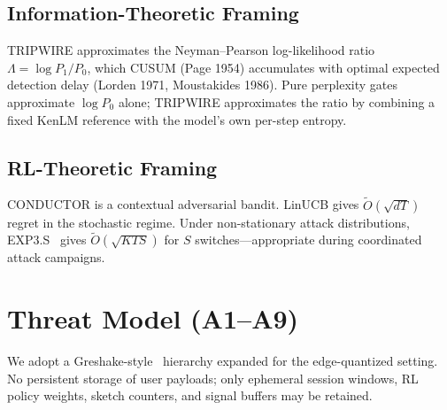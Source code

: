 \documentclass[11pt,a4paper]{article}
\begin{document}
\subsection{Information-Theoretic Framing}

TRIPWIRE approximates the Neyman--Pearson log-likelihood ratio
$\Lambda = \log P_1/P_0$, which CUSUM (Page 1954) accumulates with optimal expected
detection delay (Lorden 1971, Moustakides 1986).
Pure perplexity gates approximate $\log P_0$ alone; TRIPWIRE approximates the ratio
by combining a fixed KenLM reference with the model's own per-step entropy.

\subsection{RL-Theoretic Framing}

CONDUCTOR is a contextual adversarial bandit.
LinUCB gives $\tilde O(\sqrt{dT})$ regret in the stochastic regime.
Under non-stationary attack distributions, EXP3.S~\citep{auer2002exp3} gives
$\tilde O(\sqrt{KTS})$ for $S$ switches---appropriate during coordinated attack
campaigns.

\section{Threat Model (A1--A9)}
\label{sec:threats}

We adopt a Greshake-style~\citep{greshake2023not} hierarchy expanded for the
edge-quantized setting.
No persistent storage of user payloads; only ephemeral session windows, RL policy
weights, sketch counters, and signal buffers may be retained.
\end{document}

